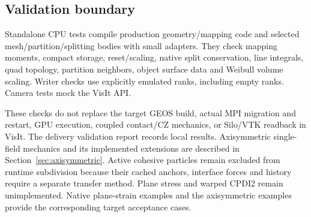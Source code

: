 \subsection{Validation boundary}
Standalone CPU tests compile production geometry/mapping code and selected
mesh/partition/splitting bodies with small adapters. They check mapping
moments, compact storage, reset/scaling, native split conservation, line
integrals, quad topology, partition neighbors, object surface data and Weibull
volume scaling. Writer checks use explicitly emulated ranks, including empty
ranks. Camera tests mock the VisIt API.

These checks do not replace the target GEOS build, actual MPI migration and
restart, GPU execution, coupled contact/CZ mechanics, or
Silo/VTK readback in VisIt. The delivery validation report records local results. Axisymmetric single-field mechanics and its implemented extensions are described in Section~\ref{sec:axisymmetric}. Active cohesive particles remain excluded from runtime subdivision because their cached anchors, interface forces and history require a separate transfer method. Plane stress and warped CPDI2 remain unimplemented. Native plane-strain examples and the axisymmetric examples provide the corresponding target acceptance cases.
